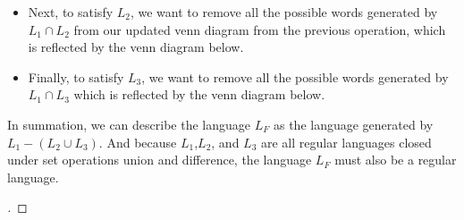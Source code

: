 \documentclass[12pt]{article}
\def\firstcircle{(90:1.75cm) circle (2.5cm)}
\def\secondcircle{(210:1.75cm) circle (2.5cm)}
\def\thirdcircle{(330:1.75cm) circle (2.5cm)}
\newenvironment{solution}[1][{\color{red} Solution:}]{\begin{trivlist}
\item[\hskip \labelsep {\bfseries #1}\hskip \labelsep {\bfseries}]}{\end{trivlist}}
\begin{document}
\begin{solution}
    \begin{itemize} [label=]
        \item Next, to satisfy $L_2$, we want to remove all the possible words generated by $L_1 \cap L_2$ from our updated venn diagram from the previous operation, which is reflected by the venn diagram below. 
    \end{itemize}

    \begin{itemize} [label=]
        \item Finally, to satisfy $L_3$, we want to remove all the possible words generated by $L_1 \cap L_3$ which is reflected by the venn diagram below.
    \end{itemize}
\item In summation, we can describe the language $L_F$ as the language generated by $L_1 - (L_2 \cup L_3)$. And because $L_1$,$L_2$, and $L_3$ are all regular languages closed under set operations union and difference, the language $L_F$ must also be a regular language. 



\begin{proof}[\unskip\nopunct]

\end{proof}

\end{solution}
\end{document}
